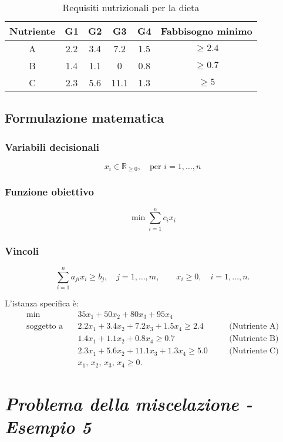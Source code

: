 \begin{table}[h]
\centering
\begin{tabular}{|c|c|c|c|c|c|}

\hline
Nutriente & G1 & G2 & G3 & G4 & Fabbisogno minimo \\
\hline
A & 2.2 & 3.4 & 7.2 & 1.5 & $\geq 2.4$ \\
\hline
B & 1.4 & 1.1 & 0 & 0.8 & $\geq 0.7$ \\
\hline
C & 2.3 & 5.6 & 11.1 & 1.3 & $\geq 5$ \\
\hline
\end{tabular}
\caption{Requisiti nutrizionali per la dieta}
\end{table}

\subsection{Formulazione matematica}

\subsubsection{Variabili decisionali}
\[ 
x_i \in \mathbb{R}_{\geq 0}, \quad \text{per } i = 1, \dots, n
\]

\subsubsection{Funzione obiettivo}
\[ 
\min \sum_{i=1}^{n} c_i x_i
\]

\subsubsection{Vincoli}
\[ 
\sum_{i=1}^{n} a_{ji} x_i \geq b_j,\quad j = 1, \dots, m,\qquad x_i \geq 0, \quad i = 1, \dots, n.
\]

L'istanza specifica è:
\begin{align}
\min \quad & 35x_1 + 50x_2 + 80x_3 + 95x_4 \\[2mm]
\text{soggetto a} \quad 
& 2.2x_1 + 3.4x_2 + 7.2x_3 + 1.5x_4 \geq 2.4 \quad && \text{(Nutriente A)} \\[1mm]
& 1.4x_1 + 1.1x_2 + 0.8x_4 \geq 0.7 \quad && \text{(Nutriente B)} \\[1mm]
& 2.3x_1 + 5.6x_2 + 11.1x_3 + 1.3x_4 \geq 5.0 \quad && \text{(Nutriente C)} \\[1mm]
& x_1, \, x_2, \, x_3, \, x_4 \geq 0.
\end{align}

\section{\textbf{\textit{Problema della miscelazione - Esempio 5}}}

